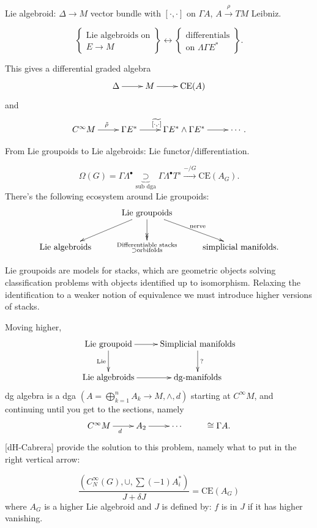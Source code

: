 \medskip{}

\medskip\noindent
Lie algebroid: $\Delta \to M$ vector bundle
with $[\cdot,\cdot]$ on $\Gamma A$,
$A \xrightarrow{\rho}TM$ Leibniz.

\begin{remark}
\label{remark-lie-algebroids-differentials}
$$
\left\{\substack{\text{Lie algebroids on} \\
E \to M}\right\}
\leftrightarrow
\left\{\substack{\text{differentials} \\
\text{on }\Lambda\Gamma E^*}\right\}.
$$
\end{remark}

\noindent
This gives a differential graded algebra
$$
\xymatrix{
\Delta\ar[r]&M\ar[r]&\text{CE}(A)
}
$$
and
$$
\xymatrix{
C^\infty M\ar[r]^{\tilde{\rho}}&\Gamma
E^*\ar[r]^{\widetilde{[\cdot,\cdot]}}
&\Gamma E^* \wedge \Gamma E^*\ar[r]&\cdots.
}
$$

From Lie groupoids to Lie algebroids:
Lie functor/differentiation.

$$
\Omega(G)=\Gamma \Lambda^\bullet
\underbrace{\supset}
_{\text{sub dga}}
\Gamma \Lambda^\bullet T^s
\xrightarrow{-/G}\text{CE}(A_G).
$$
There's the following ecosystem around Lie
groupoids:
$$
\xymatrix{
&\text{Lie groupoids}
\ar[dl]\ar@{->>}[d]\ar[dr]^{\text{nerve}}\\
\text{Lie algebroids}&
\substack{\text{Differentiable stacks} \\
\supset \text{orbifolds}}
&\text{simplicial manifolds.}
}
$$

\medskip\noindent
Lie groupoids are models for stacks,
which are geometric objects solving
classification
problems with objects identified up to
isomorphism.
Relaxing the identification to a weaker
notion
of equivalence we must introduce higher
versions of stacks.

Moving higher,
$$
\xymatrix{
\text{Lie groupoid}\ar[r]\ar[d]_{\text{Lie}}
&\text{Simplicial manifolds}\ar[d]^?\\
\text{Lie
algebroids}\ar[r]&\text{dg-manifolds}
}
$$
dg algebra is a  dga $(A=\bigoplus_{k=1}^n
A_k \to M,\wedge,d)$
starting at $C^\infty M$, and continuing
until you get to
the sections, namely
$$
\xymatrix{
C^\infty M \ar[r]_d & A_2 \ar[r]& \cdots &
\cong \Gamma A.
}
$$
[dH-Cabrera] provide the solution to this
problem,
namely what to put in the right vertical
arrow:

\begin{theorem}[dH-Cabrera]
\label{theorem-dh-cabrera}
$$
\frac{(C^\infty_N(G),\cup,\sum(-1)A^*_i)}{J+
\delta
J}
=\text{CE}(A_G)
$$
where $A_G$ is a higher Lie algebroid
and $J$ is defined by: $f$ is in $J$ if it
has higher vanishing.
\end{theorem}


